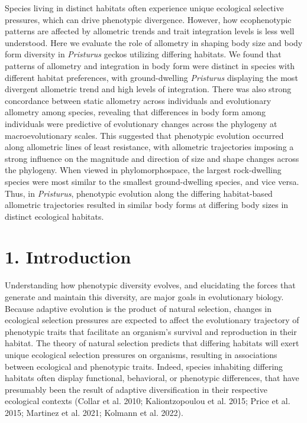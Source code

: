 \documentclass[
  11pt,
]{article}
\begin{document}
Species living in distinct habitats often experience unique ecological
selective pressures, which can drive phenotypic divergence. However, how
ecophenotypic patterns are affected by allometric trends and trait
integration levels is less well understood. Here we evaluate the role of
allometry in shaping body size and body form diversity in
\emph{Pristurus} geckos utilizing differing habitats. We found that
patterns of allometry and integration in body form were distinct in
species with different habitat preferences, with ground-dwelling
\emph{Pristurus} displaying the most divergent allometric trend and high
levels of integration. There was also strong concordance between static
allometry across individuals and evolutionary allometry among species,
revealing that differences in body form among individuals were
predictive of evolutionary changes across the phylogeny at
macroevolutionary scales. This suggested that phenotypic evolution
occurred along allometric lines of least resistance, with allometric
trajectories imposing a strong influence on the magnitude and direction
of size and shape changes across the phylogeny. When viewed in
phylomorphospace, the largest rock-dwelling species were most similar to
the smallest ground-dwelling species, and vice versa. Thus, in
\emph{Pristurus}, phenotypic evolution along the differing habitat-based
allometric trajectories resulted in similar body forms at differing body
sizes in distinct ecological habitats.

\newpage

\hypertarget{introduction}{%
\section{1. Introduction}\label{introduction}}

Understanding how phenotypic diversity evolves, and elucidating the
forces that generate and maintain this diversity, are major goals in
evolutionary biology. Because adaptive evolution is the product of
natural selection, changes in ecological selection pressures are
expected to affect the evolutionary trajectory of phenotypic traits that
facilitate an organism's survival and reproduction in their habitat. The
theory of natural selection predicts that differing habitats will exert
unique ecological selection pressures on organisms, resulting in
associations between ecological and phenotypic traits. Indeed, species
inhabiting differing habitats often display functional, behavioral, or
phenotypic differences, that have presumably been the result of adaptive
diversification in their respective ecological contexts (Collar et al.
2010; Kaliontzopoulou et al. 2015; Price et al. 2015; Martinez et al.
2021; Kolmann et al. 2022). \hfill\break
\end{document}
